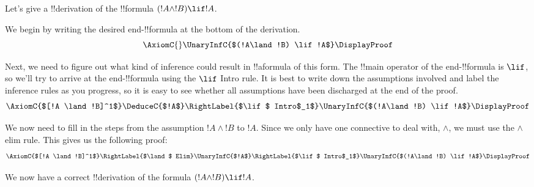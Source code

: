 \documentclass[../../include/open-logic-section]{subfiles}
\begin{document}


\begin{ex}
Let's give a !!{derivation} of the !!{formula} $(!A \land !B) \lif !A$.

We begin by writing the desired end-!!{formula} at the bottom of the derivation.
\[
\AxiomC{}
\UnaryInfC{$(!A\land !B) \lif !A$}
\DisplayProof
\]

Next, we need to figure out what kind of inference could result in
!!a{formula} of this form. The !!{main operator} of the
end-!!{formula} is $\lif$, so we'll try to arrive at the
end-!!{formula} using the $\lif$ Intro rule. It is best to write down
the assumptions involved and label the inference rules as you
progress, so it is easy to see whether all assumptions have been
discharged at the end of the proof.
\[
\AxiomC{$[!A \land !B]^1$}
\DeduceC{$!A$}
\RightLabel{$\lif$ Intro$_1$} 
\UnaryInfC{$(!A\land !B) \lif !A$}
\DisplayProof
\]

We now need to fill in the steps from the assumption $!A \land !B$ to $!A$.
Since we only have one connective to deal with, $\land$, we must
use the $\land$ elim rule. This gives us the following proof:
\[
\AxiomC{$[!A \land !B]^1$}
\RightLabel{$\land$ Elim}
\UnaryInfC{$!A$}
\RightLabel{$\lif$ Intro$_1$} 
\UnaryInfC{$(!A\land !B) \lif !A$}
\DisplayProof
\]

We now have a correct !!{derivation} of the formula $(!A \land
!B) \lif !A$.
\end{ex}
\end{document}
